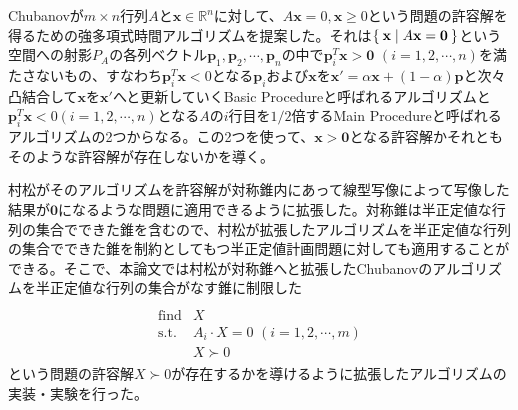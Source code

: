 Chubanovが$m \times n$行列$A$と$\mathbf{x} \in \mathbb{R}^n$に対して、$A \mathbf{x} = 0, \mathbf{x} \geq 0$という問題の許容解を得るための強多項式時間アルゴリズムを提案した。それは$\Set{\mathbf{x} | A \mathbf{x} = \mathbf{0}}$という空間への射影$P_A$の各列ベクトル$\mathbf{p}_1, \mathbf{p}_2, \cdots, \mathbf{p}_n$の中で$\mathbf{p}_i^T \mathbf{x} > \mathbf{0} \,\, (i = 1, 2, \cdots, n)$を満たさないもの、すなわち$\mathbf{p}_i^T \mathbf{x} < 0$となる$\mathbf{p}_i$および$\mathbf{x}$を$\mathbf{x}' = \alpha \mathbf{x} + (1 - \alpha) \mathbf{p}$と次々凸結合して$\mathbf{x}$を$\mathbf{x}'$へと更新していくBasic Procedureと呼ばれるアルゴリズムと$\mathbf{p}_i^T \mathbf{x} < 0 (i = 1, 2, \cdots, n)$となる$A$の$i$行目を$1 / 2$倍するMain Procedureと呼ばれるアルゴリズムの2つからなる。この2つを使って、$\mathbf{x} > \mathbf{0}$となる許容解かそれともそのような許容解が存在しないかを導く。

村松がそのアルゴリズムを許容解が対称錐内にあって線型写像によって写像した結果が$\mathbf{0}$になるような問題に適用できるように拡張した。対称錐は半正定値な行列の集合でできた錐を含むので、村松が拡張したアルゴリズムを半正定値な行列の集合でできた錐を制約としてもつ半正定値計画問題に対しても適用することができる。そこで、本論文では村松が対称錐へと拡張したChubanovのアルゴリズムを半正定値な行列の集合がなす錐に制限した
\begin{align} \label{MainProblem}
  \begin{array}{ll} \\
    \text{find} & X \\
    \text{s.t.} & A_i \cdot X = 0 \,\, (i = 1, 2, \cdots, m) \\
                & X \succ 0
  \end{array}
\end{align}
という問題の許容解$X \succ 0$が存在するかを導けるように拡張したアルゴリズムの実装・実験を行った。
